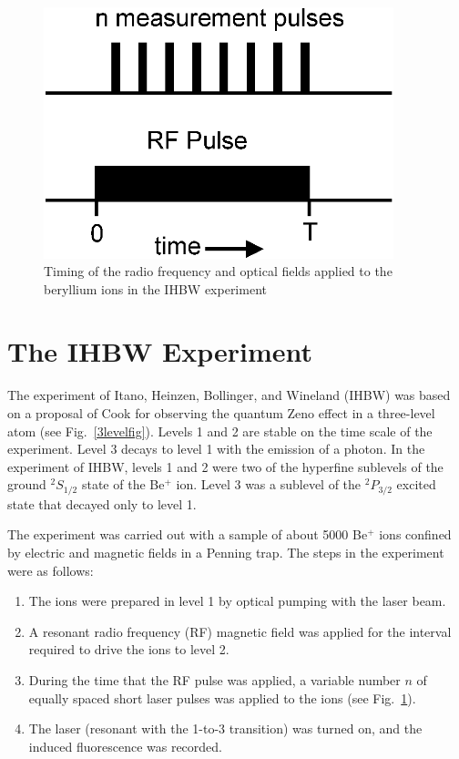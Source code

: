 \documentclass[12pt]{article}
\begin{document}
\begin{figure}[htb]
\begin{center}
\includegraphics[width=4in]{timing2.eps}
\end{center}
\caption{\label{pulsefig}Timing of the radio frequency and optical
fields applied to the beryllium ions in the IHBW experiment}
\end{figure}



\section{The IHBW Experiment}

The experiment of Itano, Heinzen, Bollinger, and Wineland (IHBW)
\cite{itano90} was based on a proposal of Cook \cite{cook88} for
observing the quantum Zeno effect in a three-level atom (see
Fig.~\ref{3levelfig}).  Levels 1 and 2 are stable on the time scale
of the experiment.  Level 3 decays to level 1 with the emission of a
photon.  In the experiment of IHBW, levels 1 and 2 were two of the
hyperfine sublevels of the ground $^2S_{1/2}$ state of the Be$^+$
ion. Level 3 was a sublevel of the $^2P_{3/2}$ excited state that
decayed only to level 1.

The experiment was carried out with a sample of about 5000 Be$^+$
ions confined by electric and magnetic fields in a Penning trap. The
steps in the experiment were as follows:
\begin{enumerate}
\item{The ions were prepared in level 1 by optical pumping with the
laser beam.}
\item{A resonant radio frequency (RF) magnetic field was applied for
the interval required to drive the ions to level 2.}
\item{During the time that the RF pulse was applied, a variable
number $n$ of equally spaced short laser pulses was applied to the
ions (see Fig.~\ref{pulsefig}).}
\item{The laser (resonant with the 1-to-3 transition) was turned on,
and the induced fluorescence was recorded.}
\end{enumerate}
\end{document}

